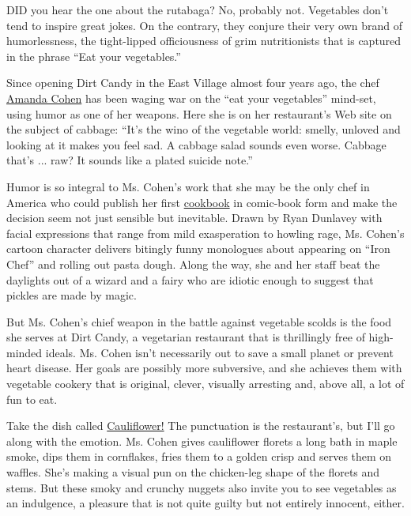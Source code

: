DID you hear the one about the rutabaga? No, probably not. Vegetables
don't tend to inspire great jokes. On the contrary, they conjure their
very own brand of humorlessness, the tight-lipped officiousness of grim
nutritionists that is captured in the phrase ``Eat your vegetables.''

Since opening Dirt Candy in the East Village almost four years ago, the
chef
\href{http://dinersjournal.blogs.nytimes3xbfgragh.onion/2012/08/16/q-a-amanda-cohen-of-dirt-candy/}{Amanda
Cohen} has been waging war on the ``eat your vegetables'' mind-set,
using humor as one of her weapons. Here she is on her restaurant's Web
site on the subject of cabbage: ``It's the wino of the vegetable world:
smelly, unloved and looking at it makes you feel sad. A cabbage salad
sounds even worse. Cabbage that's ... raw? It sounds like a plated
suicide note.''

Humor is so integral to Ms. Cohen's work that she may be the only chef
in America who could publish her first
\href{http://www.youtube.com/watch?feature=player_embedded\&v=1u7GfLGNG3s}{cookbook}
in comic-book form and make the decision seem not just sensible but
inevitable. Drawn by Ryan Dunlavey with facial expressions that range
from mild exasperation to howling rage, Ms. Cohen's cartoon character
delivers bitingly funny monologues about appearing on ``Iron Chef'' and
rolling out pasta dough. Along the way, she and her staff beat the
daylights out of a wizard and a fairy who are idiotic enough to suggest
that pickles are made by magic.

But Ms. Cohen's chief weapon in the battle against vegetable scolds is
the food she serves at Dirt Candy, a vegetarian restaurant that is
thrillingly free of high-minded ideals. Ms. Cohen isn't necessarily out
to save a small planet or prevent heart disease. Her goals are possibly
more subversive, and she achieves them with vegetable cookery that is
original, clever, visually arresting and, above all, a lot of fun to
eat.

Take the dish called
\href{http://www.dirtcandynyc.com/?p=2950}{Cauliflower!} The punctuation
is the restaurant's, but I'll go along with the emotion. Ms. Cohen gives
cauliflower florets a long bath in maple smoke, dips them in cornflakes,
fries them to a golden crisp and serves them on waffles. She's making a
visual pun on the chicken-leg shape of the florets and stems. But these
smoky and crunchy nuggets also invite you to see vegetables as an
indulgence, a pleasure that is not quite guilty but not entirely
innocent, either.

